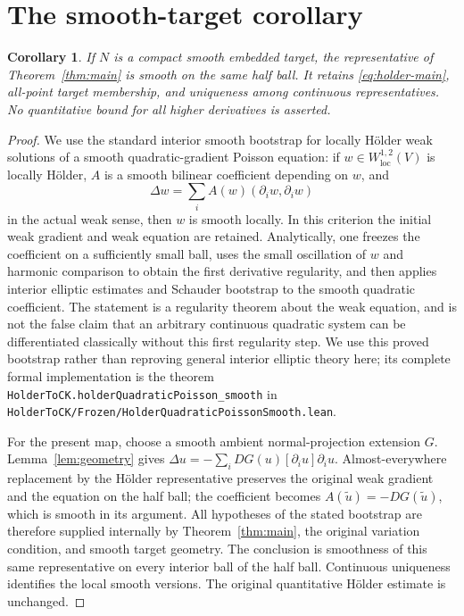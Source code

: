 \documentclass[11pt,a4paper]{article}
\numberwithin{equation}{section}
\newtheorem{corollary}[theorem]{Corollary}
\theoremstyle{definition}
\theoremstyle{remark}
\newcommand{\loc}{\mathrm{loc}}
\newcommand{\lean}[1]{\nolinkurl{#1}}
\begin{document}
\section{The smooth-target corollary}\label{sec:smooth}
\begin{corollary}\label{cor:smooth}
If $N$ is a compact smooth embedded target, the representative of
Theorem~\ref{thm:main} is smooth on the same half ball. It retains
\eqref{eq:holder-main}, all-point target membership, and uniqueness
among continuous representatives. No quantitative bound for all higher
derivatives is asserted.
\end{corollary}
\begin{proof}
We use the standard interior smooth bootstrap for locally H\"older
weak solutions of a smooth quadratic-gradient Poisson equation:
if $w\in W^{1,2}_{\loc}(V)$ is locally H\"older, $A$ is a smooth
bilinear coefficient depending on $w$, and
\[
 \Delta w=\sum_i A(w)(\partial_iw,\partial_iw)
\]
in the actual weak sense, then $w$ is smooth locally. In this criterion
the initial weak gradient and weak equation are retained. Analytically,
one freezes the coefficient on a sufficiently small ball, uses the
small oscillation of $w$ and harmonic comparison to obtain the first
derivative regularity, and then applies interior elliptic estimates and
Schauder bootstrap to the smooth quadratic coefficient. The statement
is a regularity theorem about the weak equation, and is not the false
claim that an arbitrary continuous quadratic system can be differentiated
classically without this first regularity step. We use this proved
bootstrap rather than reproving general interior elliptic theory here;
its complete formal implementation is the theorem
\lean{HolderToCK.holderQuadraticPoisson_smooth} in
\lean{HolderToCK/Frozen/HolderQuadraticPoissonSmooth.lean}.

For the present map, choose a smooth ambient normal-projection
extension $G$. Lemma~\ref{lem:geometry} gives
$\Delta u=-\sum_i DG(u)[\partial_i u]\partial_i u$.
Almost-everywhere replacement by the H\"older representative preserves
the original weak gradient and the equation on the half ball; the
coefficient becomes $A(\widetilde u)=-DG(\widetilde u)$, which is
smooth in its argument. All hypotheses of the stated bootstrap are
therefore supplied internally by Theorem~\ref{thm:main}, the original
variation condition, and smooth target geometry. The conclusion is
smoothness of this same representative on every interior ball of the
half ball. Continuous uniqueness identifies the local smooth versions.
The original quantitative H\"older estimate is unchanged.
\end{proof}
\end{document}
